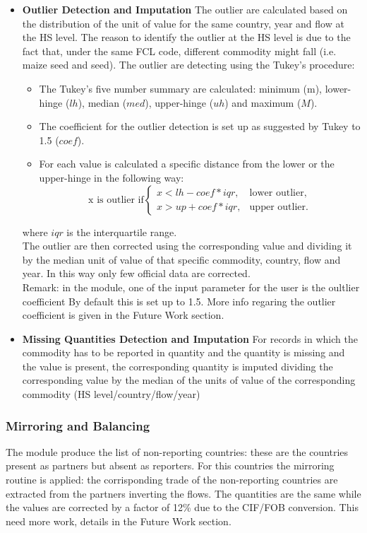 \documentclass[nojss]{jss}\usepackage[]{graphicx}\usepackage[]{color}
\begin{document}
\begin{itemize}
\item {\bf Outlier Detection and Imputation} The outlier are calculated based on the distribution of the unit of value for the same country, year and flow at the HS level. The reason to identify the outlier at the HS level is due to the fact that, under the same FCL code, different commodity might fall (i.e. maize seed and seed). The outlier are detecting using the Tukey's procedure:
\begin{itemize}
\item The Tukey's five number summary are calculated: minimum (m), lower-hinge ($lh$), median ($med$), upper-hinge ($uh$) and maximum ($M$).
\item The coefficient for the outlier detection is set up as suggested by Tukey to 1.5 ($coef$).
\item For each value is calculated a specific distance from the lower or the upper-hinge in the following way:
\begin{equation}
\text{x is outlier if} \begin{cases}
    x < lh - coef * iqr, & \text{lower outlier},\\
    x > up + coef * iqr, & \text{upper outlier}.
  \end{cases}
\end{equation}
\end{itemize}
where $iqr$ is the interquartile range.\\

The outlier are then corrected using the corresponding value and dividing it by the median unit of value of that specific commodity, country, flow and year. In this way only few official data are corrected.\\
Remark: in the module, one of the input parameter for the user is the oultlier coefficient By default this is set up to 1.5. More info regaring the outlier coefficient is given in the Future Work section.

\item {\bf Missing Quantities Detection and Imputation} For records in which the commodity has to be reported in quantity and the quantity is missing and the value is present, the corresponding quantity is imputed dividing the corresponding value by the median of the units of value of the corresponding commodity (HS level/country/flow/year)
\end{itemize}

\subsubsection{Mirroring and Balancing}
The module produce the list of non-reporting countries: these are the countries present as partners but absent as reporters. For this countries the mirroring routine is applied: the corrisponding trade of the non-reporting countries are extracted from the partners inverting the flows. The quantities are the same while the values are corrected by a factor of 12\% due to the CIF/FOB conversion. This need more work, details in the Future Work section.\\
\end{document}
